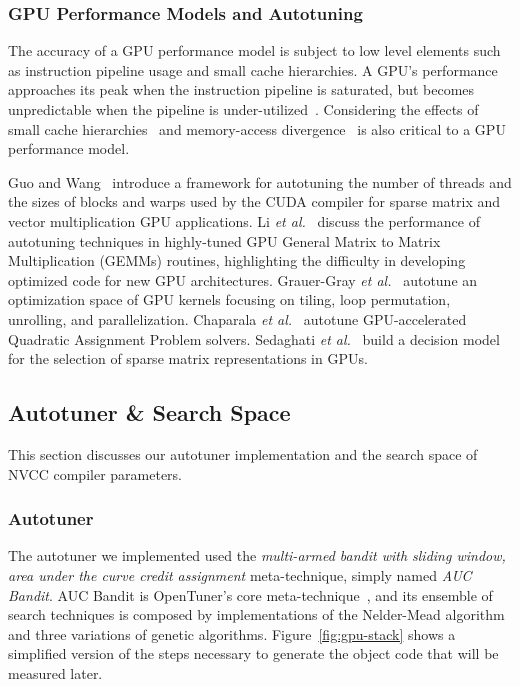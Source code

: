 \subsubsection{GPU Performance Models and Autotuning}

The accuracy of a GPU performance model is subject to low level elements such
as instruction pipeline usage and small cache hierarchies. A GPU's performance
approaches its peak when the instruction pipeline is saturated, but becomes
unpredictable when the pipeline is
under-utilized~\cite{zhang2011quantitative,amaris2015simple}.  Considering the
effects of small cache hierarchies~\cite{dao2015performance,picchi2015impact}
and memory-access
divergence~\cite{sampaio2013divergence,baghsorkhi2010adaptive} is also critical
to a GPU performance model.

Guo and Wang~\cite{guo2010auto} introduce a framework for autotuning
the number of threads and the sizes of blocks and warps used by the CUDA
compiler for sparse matrix and vector multiplication GPU applications.  Li
\emph{et al.}~\cite{li2009note} discuss the performance of autotuning
techniques in highly-tuned GPU General Matrix to Matrix Multiplication (GEMMs)
routines, highlighting the difficulty in developing optimized code for new GPU
architectures.  Grauer-Gray \emph{et al.}~\cite{grauer2012auto}
autotune an optimization space of GPU kernels focusing on tiling, loop
permutation, unrolling, and parallelization.  Chaparala \emph{et
al.}~\cite{chaparala2015autotuning} autotune GPU-accelerated Quadratic
Assignment Problem solvers.  Sedaghati \emph{et
al.}~\cite{sedaghati2015automatic} build a decision model for the selection of
sparse matrix representations in GPUs.

\subsection{Autotuner \& Search Space}
\label{sec:tunersearch}

This section discusses our autotuner implementation and the
search space of NVCC compiler parameters.

\subsubsection{Autotuner}

The autotuner we implemented used the \textit{multi-armed bandit with sliding
window, area under the curve credit assignment} meta-technique, simply named
\textit{AUC Bandit}.  AUC Bandit is OpenTuner's core
meta-technique~\cite{ansel2014opentuner}, and its ensemble of search techniques
is composed by implementations of the Nelder-Mead algorithm and three
variations of genetic algorithms.  Figure~\ref{fig:gpu-stack} shows a
simplified version of the steps necessary to generate the object code that will
be measured later.

